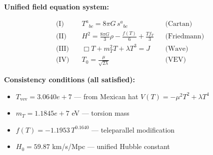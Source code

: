 
\textbf{Unified field equation system:}

\begin{align}
  \text{(I)} \quad & T^a{}_{bc} = 8\pi G \, s^a{}_{bc} && \text{(Cartan)} \\
  \text{(II)} \quad & H^2 = \frac{8\pi G}{3}\rho - \frac{f(T)}{6} + \frac{Tf_T}{3} && \text{(Friedmann)} \\
  \text{(III)} \quad & \Box T + m_T^2 T + \lambda T^3 = J && \text{(Wave)} \\
  \text{(IV)} \quad & T_0 = \frac{\mu}{\sqrt{2\lambda}} && \text{(VEV)}
\end{align}

\textbf{Consistency conditions (all satisfied):}
\begin{itemize}
  \item $T_{\text{vev}} = 3.0640e+7$ — from Mexican hat $V(T) = -\mu^2 T^2 + \lambda T^4$
  \item $m_T = 1.1845e+7$ eV — torsion mass
  \item $f(T) = -1.1953 \, T^{0.1640}$ — teleparallel modification
  \item $H_0 = 59.87$ km/s/Mpc — unified Hubble constant
\end{itemize}